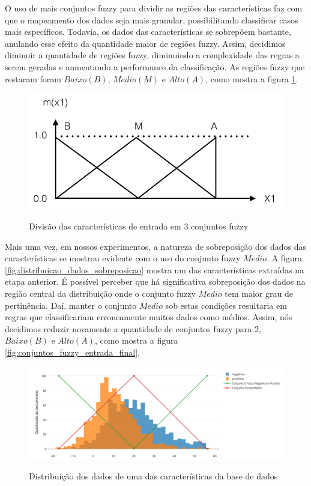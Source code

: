 O uso de mais conjuntos fuzzy para dividir as regiões das características faz com que o mapeamento dos dados seja mais granular, possibilitando classificar casos mais específicos. Todavia, os dados das características se sobrepõem bastante, anulando esse efeito da quantidade maior de regiões fuzzy. Assim, decidimos diminuir a quantidade de regiões fuzzy, diminuindo a complexidade das regras a serem geradas e aumentando a performance da classificação. As regiões fuzzy que restaram foram $Baixo (B)$, $Medio (M)$ e $Alto (A)$, como mostra a figura \ref{figura:tres_conjuntos_fuzzy}.

\begin{figure}[h]
\caption{Divisão das características de entrada em 3 conjuntos fuzzy}
\centering
\includegraphics[scale=0.45]{tres_conjuntos_fuzzy.png}
\label{figura:tres_conjuntos_fuzzy}
\end{figure}

Mais uma vez, em nossos experimentos, a natureza de sobreposição dos dados das características se mostrou evidente com o uso do conjunto fuzzy $Medio$. A figura \ref{fig:distribuicao_dados_sobreposicao} mostra um das características extraídas na etapa anterior. É possível perceber que há significativa sobreposição dos dados na região central da distribuição onde o conjunto fuzzy $Medio$ tem maior grau de pertinência. Daí, manter o conjunto $Medio$ sob estas condições resultaria em regras que classificariam erroneamente muitos dados como médios. Assim, nós decidimos reduzir novamente a quantidade de conjuntos fuzzy para 2, $Baixo (B)$ e $Alto (A)$, como mostra a figura \ref{fig:conjuntos_fuzzy_entrada_final}. 

\begin{figure}[h]
\caption{Distribuição dos dados de uma das características da base de dados}
\centering
\includegraphics[scale=0.45]{distribuicao_dados_sobreposicao.png}
\label{figura:distribuicao_dados_sobreposicao}
\end{figure}

